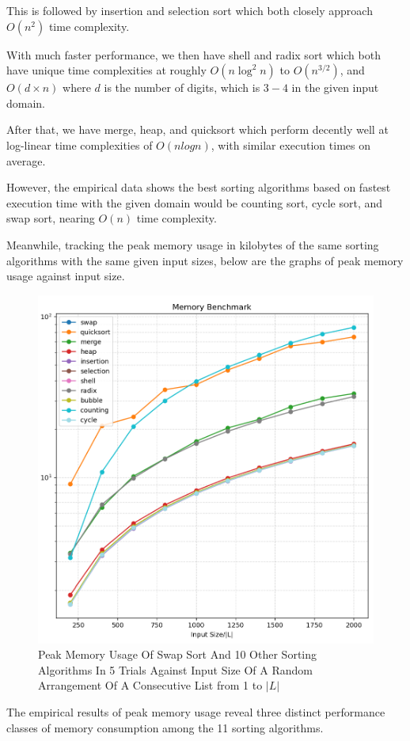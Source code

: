 \documentclass[12pt]{article}
\begin{document}
This is followed by insertion and selection sort which both closely approach $O(n^2)$ time complexity.

With much faster performance, we then have shell and radix sort which both have unique time complexities at roughly $O(n \log^2 n)$ to $O(n^{3/2})$, and $O(d \times n)$ where $d$ is the number of digits, which is $3-4$ in the given input domain.

After that, we have merge, heap, and quicksort which perform decently well at log-linear time complexities of $O(nlogn)$, with similar execution times on average.

However, the empirical data shows the best sorting algorithms based on fastest execution time with the given domain would be counting sort, cycle sort, and swap sort, nearing $O(n)$ time complexity.

Meanwhile, tracking the peak memory usage in kilobytes of the same sorting algorithms with the same given input sizes, below are the graphs of peak memory usage against input size.

\begin{figure}[H]
    \centering
    \includegraphics[width=0.75\linewidth]{Memory_Benchmark.png}
    \caption{Peak Memory Usage Of Swap Sort And 10 Other Sorting Algorithms In 5 Trials Against Input Size Of A Random Arrangement Of A Consecutive List from 1 to $|L|$}
    \label{fig:placeholder}
\end{figure}

The empirical results of peak memory usage reveal three distinct performance classes of memory consumption among the 11 sorting algorithms.
\end{document}
